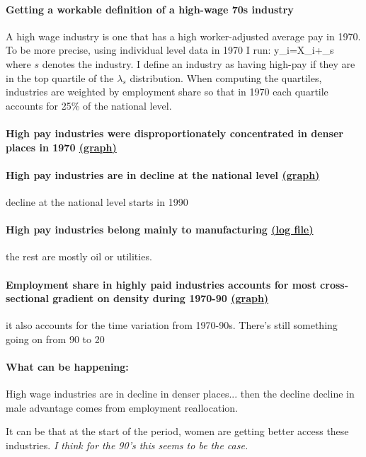 \paragraph{Getting a workable definition of a high-wage 70s industry}
A high wage industry is one that has a high worker-adjusted average pay in 1970. To be more precise, using individual level data in 1970 I run:
\beqn
y_{i}=X_{i}\beta+\lambda_{s}
\eeqn
where $s$ denotes the industry.  I define an industry as having high-pay if they are in the top quartile of the $\lambda_{s}$ distribution. When computing the quartiles, industries are weighted by employment share so that in 1970 each quartile accounts for 25\% of the national level.

\paragraph{High pay industries were disproportionately concentrated in denser places in 1970 \href{https://www.dropbox.com/s/dwse5a96c5xl2xx/high_pay_ind_density_full_time.png?dl=0}{(graph)}}

\paragraph{High pay industries are in decline at the national level \href{https://www.dropbox.com/s/nwr1ozinncqehnh/employment_share_quartile_by_year_full_time.png?dl=0}{(graph)}} decline at the national level starts in 1990


\paragraph{High pay industries belong mainly to manufacturing \href{https://www.dropbox.com/s/kle6o99of1zxtlo/high_pay_industries.txt?dl=0}{(log file)}} the rest are mostly oil or utilities.

\paragraph{Employment share in highly paid industries accounts for most cross-sectional gradient on density during 1970-90 \href{https://www.dropbox.com/s/qgp2oos8g379e36/controlling_high_wage_industries_full_time.png?dl=0}{(graph)}} it also accounts for the time variation from 1970-90s. There's still something going on from 90 to 20

\paragraph{What can be happening:}
\bitem
	\item High wage industries are in decline in denser places... then the decline decline in male advantage comes from employment reallocation.
	\item It can be that at the start of the period, women are getting better access these industries. \textit{I think for the 90's this seems to be the case.}
\eitem



